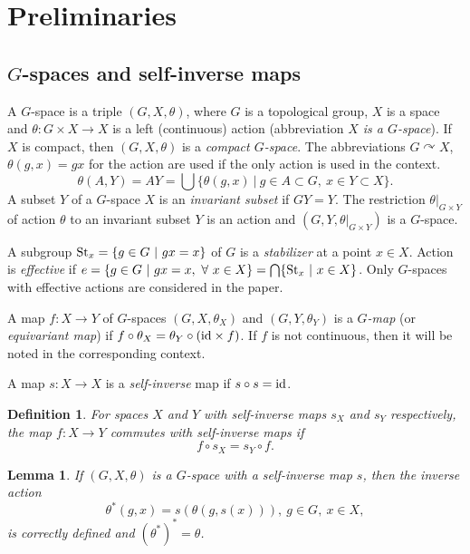 \documentclass{amsart}
\newtheorem{lem}[thm]{Lemma}
\newtheorem{df}[thm]{Definition}
\newcommand{\id}{\mbox{{\rm id}}}
\newcommand{\St}{\mbox{{\rm St}}}
\begin{document}

\section{Preliminaries} 

\subsection{$G$-spaces and self-inverse maps}

A $G$-space is a triple $(G, X, \theta)$, where $G$ is a topological group, $X$ is a space and $\theta: G\times X\to X$ is a left (continuous) action (abbreviation {\it $X$ is a $G$-space}). If $X$ is compact, then  $(G, X, \theta)$ is a {\it compact $G$-space}. 
The abbreviations $G\curvearrowright X$, $\theta (g, x)=gx$ for the action are used if the only action is used in the context. 
$$\theta (A, Y)=AY=\bigcup\{\theta (g, x)\ |\ g\in A\subset G,\ x\in Y\subset X\}.$$
A subset $Y$ of a $G$-space $X$ is an {\it invariant subset} if $GY=Y$. The restriction $\theta|_{G\times Y}$ of action $\theta$ to an invariant subset $Y$ is an action and  $(G, Y, \theta|_{G\times Y})$ is a $G$-space.

A subgroup $\St_x=\{g\in G\ |\ gx=x\}$ of $G$ is a {\it stabilizer} at a point $x\in X$. Action is {\it effective} if $e=\{g\in G\ |\ gx=x,\ \forall\ x\in X\}=\bigcap\{\St_x\ |\ x\in X\}$. Only $G$-spaces with effective actions are considered in the paper. 

A map $f: X\to Y$ of $G$-spaces $(G, X, \theta_X)$ and  $(G, Y, \theta_Y)$  is a {\it $G$-map} (or {\it equivariant map}) if $f\circ\theta_X=\theta_Y\circ (\id\times f)$.  If $f$ is not continuous, then it will be noted in the corresponding context.

\medskip

A map $s: X\to X$ is a {\it self-inverse} map if $s\circ s=\id$. 

\begin{df}
For spaces $X$ and $Y$ with self-inverse maps $s_X$ and $s_Y$ respectively, the map $f: X\to Y$ {\it commutes with self-inverse maps} if $$f\circ s_X=s_Y\circ f.$$ 
\end{df}

\begin{lem}\label{invaction}
If $(G, X, \theta)$ is a $G$-space with a self-inverse map $s$, then the {\it inverse action}  
$$\theta^* (g, x)=s(\theta (g, s(x))),\ g\in G,\ x\in X,$$
is correctly defined and $(\theta^*)^*=\theta$. 
\end{lem}
\end{document}
